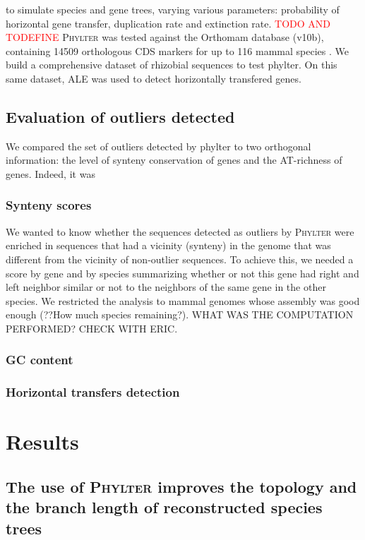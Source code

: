 \documentclass{article}
\begin{document}
to simulate species and gene trees, varying various parameters: probability of horizontal gene transfer, duplication rate and extinction rate. \textcolor{red}{TODO AND TODEFINE}
\textsc{Phylter} was tested against the Orthomam database (v10b), containing 14509 orthologous CDS markers for up to 116 mammal species \cite{orthomam_2019}. 
We build a comprehensive dataset of rhizobial sequences to test phylter. On this same dataset, ALE was used to detect horizontally transfered genes. 

\subsection{Evaluation of outliers detected}
We compared the set of outliers detected by phylter to two orthogonal information: the level of synteny conservation of genes and the AT-richness of genes. Indeed, it was 
\subsubsection*{Synteny scores}
We wanted to know whether the sequences detected as outliers by \textsc{Phylter} were enriched in sequences that had a vicinity (synteny) in the genome that was different from the vicinity of non-outlier sequences. To achieve this, we needed a score by gene and by species summarizing whether or not this gene had right and left neighbor similar or not to the neighbors of the same gene in the other species. We restricted the analysis to mammal genomes whose assembly was good enough (??How much species remaining?). 
WHAT WAS THE COMPUTATION PERFORMED? CHECK WITH ERIC.  
\subsubsection*{GC content}
\subsubsection*{Horizontal transfers detection}


\section{Results}


\subsection{The use of \textsc{Phylter} improves the topology and the branch length of reconstructed species trees}
\end{document}
